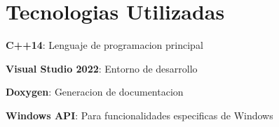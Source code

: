 \chapter{Tecnologias Utilizadas }
\hypertarget{tecnologias}{}\label{tecnologias}

\begin{DoxyItemize}
\item {\bfseries{C++14}}\+: Lenguaje de programacion principal
\item {\bfseries{Visual Studio 2022}}\+: Entorno de desarrollo
\item {\bfseries{Doxygen}}\+: Generacion de documentacion
\item {\bfseries{Windows API}}\+: Para funcionalidades especificas de Windows 
\end{DoxyItemize}